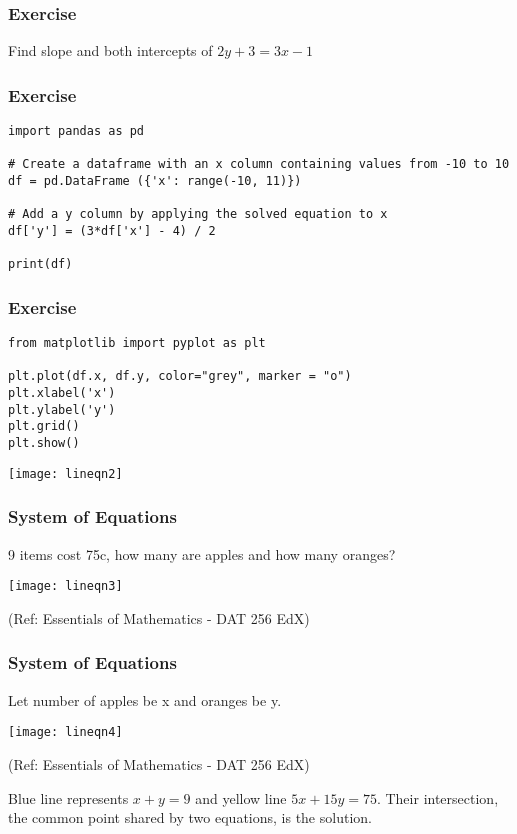  \begin{frame}[fragile]\frametitle{Exercise}
Find slope and both intercepts of $2y + 3 = 3x -1 $
\end{frame}

 \begin{frame}[fragile]\frametitle{Exercise}
\begin{lstlisting}
import pandas as pd

# Create a dataframe with an x column containing values from -10 to 10
df = pd.DataFrame ({'x': range(-10, 11)})

# Add a y column by applying the solved equation to x
df['y'] = (3*df['x'] - 4) / 2

print(df)
\end{lstlisting}
\end{frame}

 \begin{frame}[fragile]\frametitle{Exercise}
\begin{lstlisting}
from matplotlib import pyplot as plt

plt.plot(df.x, df.y, color="grey", marker = "o")
plt.xlabel('x')
plt.ylabel('y')
plt.grid()
plt.show()
\end{lstlisting}
\begin{center}
\texttt{[image: lineqn2]}
\end{center}
\end{frame}


 \begin{frame}[fragile]\frametitle{System of Equations}
 9 items cost 75c, how many are apples and how many oranges?
\begin{center}
\texttt{[image: lineqn3]}

{\tiny (Ref: Essentials of Mathematics - DAT 256 EdX)}
\end{center}
\end{frame}

 \begin{frame}[fragile]\frametitle{System of Equations}
Let number of apples be x and oranges be y.
\begin{center}
\texttt{[image: lineqn4]}

{\tiny (Ref: Essentials of Mathematics - DAT 256 EdX)}
\end{center}
Blue line represents $x+y=9$ and yellow line $5x+15y=75$. Their intersection, the common point shared by two equations, is the solution.
\end{frame}

